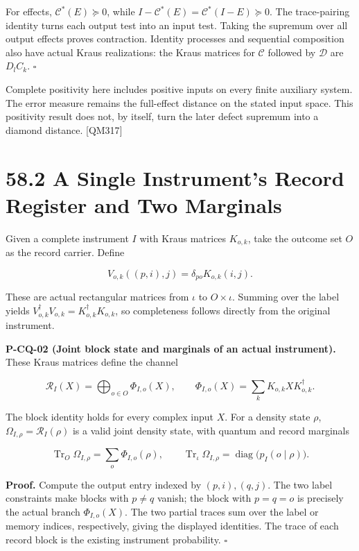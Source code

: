 \documentclass[
  11pt,
  oneside]{book}
\begin{document}
For effects, \(\mathcal C^*(E)\succeq0\), while
\(I-\mathcal C^*(E)=\mathcal C^*(I-E)\succeq0\). The trace-pairing
identity turns each output test into an input test. Taking the supremum
over all output effects proves contraction. Identity processes and
sequential composition also have actual Kraus realizations: the Kraus
matrices for \(\mathcal C\) followed by \(\mathcal D\) are \(D_lC_k\).
\(\square\)

Complete positivity here includes positive inputs on every finite
auxiliary system. The error measure remains the full-effect distance on
the stated input space. This positivity result does not, by itself, turn
the later defect supremum into a diamond distance. {[}QM317{]}

\section{58.2 A Single Instrument's Record Register and Two Marginals}

Given a complete instrument \(I\) with Kraus matrices \(K_{o,k}\), take
the outcome set \(O\) as the record carrier. Define

\[
V_{o,k}((p,i),j)=\delta_{po}K_{o,k}(i,j).
\]

These are actual rectangular matrices from \(\iota\) to
\(O\times\iota\). Summing over the label yields
\(V_{o,k}^\dagger V_{o,k}=K_{o,k}^\dagger K_{o,k}\), so completeness
follows directly from the original instrument.

\label{p-cq-02}{}

\textbf{P-CQ-02 (Joint block state and marginals of an actual
instrument).} These Kraus matrices define the channel

\[
\mathcal R_I(X)=\bigoplus_{o\in O}\Phi_{I,o}(X),\qquad
\Phi_{I,o}(X)=\sum_kK_{o,k}XK_{o,k}^\dagger.
\]

The block identity holds for every complex input \(X\). For a density
state \(\rho\), \(\Omega_{I,\rho}=\mathcal R_I(\rho)\) is a valid joint
density state, with quantum and record marginals

\[
\operatorname{Tr}_{O}\Omega_{I,\rho}=\sum_o\Phi_{I,o}(\rho),\qquad
\operatorname{Tr}_{\iota}\Omega_{I,\rho}
=\operatorname{diag}\bigl(p_I(o\mid\rho)\bigr).
\]

\textbf{Proof.} Compute the output entry indexed by \((p,i),(q,j)\). The
two label constraints make blocks with \(p\ne q\) vanish; the block with
\(p=q=o\) is precisely the actual branch \(\Phi_{I,o}(X)\). The two
partial traces sum over the label or memory indices, respectively,
giving the displayed identities. The trace of each record block is the
existing instrument probability. \(\square\)
\end{document}
